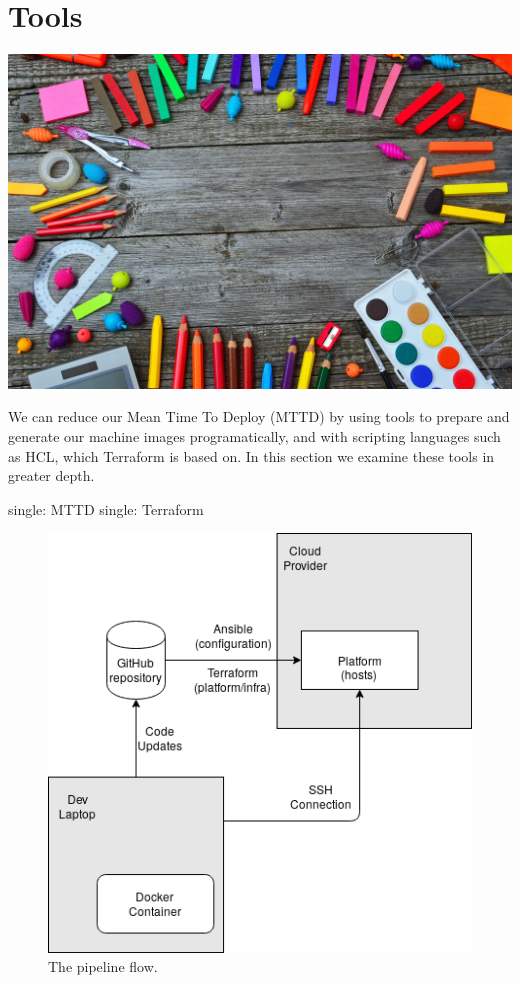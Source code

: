 \chapter{Tools}

\includegraphics{../images/school-tools-3596680_1920.jpg}

We can reduce our Mean Time To Deploy (MTTD)
by using tools to prepare and generate our machine images
programatically, and with scripting languages such as HCL, which
Terraform
is based on. In this section we examine these tools in greater depth.

single: MTTD
single: Terraform

\begin{figure}
   \centering
   \includegraphics{../images/infra_flow.png}
   \caption{The pipeline flow.}
\end{figure}

